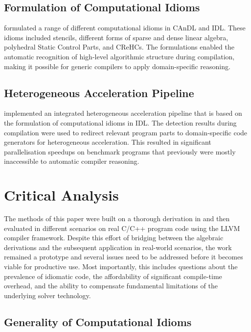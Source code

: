 \subsection*{Formulation of Computational Idioms}

     formulated a range of
    different computational idioms in CAnDL and IDL.
    These idioms included stencils, different forms of sparse and dense linear
    algebra, polyhedral Static Control Parts, and CReHCs.
    The formulations enabled the automatic recognition of high-level algorithmic
    structure during compilation, making it possible for generic compilers to
    apply domain-specific reasoning.

\subsection*{Heterogeneous Acceleration Pipeline}

     implemented an integrated heterogeneous acceleration
    pipeline that is based on the formulation of computational idioms in IDL.
    The detection results during compilation were used to redirect relevant
    program parts to domain-specific code generators for heterogeneous
    acceleration.
    This resulted in significant parallelisation speedups on benchmark
    programs that previously were mostly inaccessible to automatic compiler
    reasoning.

\section{Critical Analysis}

    The methods of this paper were built on a thorough derivation in
     and then evaluated in different scenarios on real
    C/C++ program code using the LLVM compiler framework.
    Despite this effort of bridging between the algebraic derivations and the
    subsequent application in real-world scenarios, the work remained a
    prototype and several issues need to be addressed before it becomes viable
    for productive use.
    Most importantly, this includes questions about the prevalence of idiomatic
    code, the affordability of significant compile-time overhead, and the
    ability to compensate fundamental limitations of the underlying solver
    technology.

\subsection*{Generality of Computational Idioms}  

